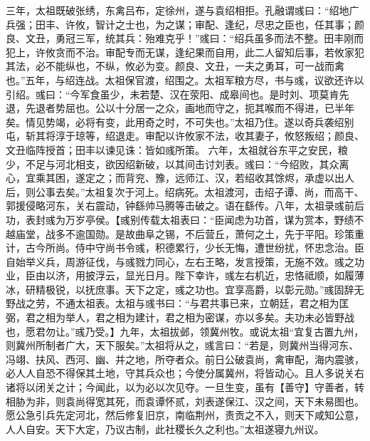 \documentclass[12pt,UTF8]{ctexbook}
\begin{document}
三年，太祖既破张绣，东禽吕布，定徐州，遂与袁绍相拒。孔融谓彧曰：“绍地广兵强；田丰、许攸，智计之士也，为之谋；审配、逢纪，尽忠之臣也，任其事；颜良、文丑，勇冠三军，统其兵：殆难克乎！”彧曰：“绍兵虽多而法不整。田丰刚而犯上，许攸贪而不治。审配专而无谋，逢纪果而自用，此二人留知后事，若攸家犯其法，必不能纵也，不纵，攸必为变。颜良、文丑，一夫之勇耳，可一战而禽也。”五年，与绍连战。太祖保官渡，绍围之。太祖军粮方尽，书与彧，议欲还许以引绍。彧曰：“今军食虽少，未若楚、汉在荥阳、成皋间也。是时刘、项莫肯先退，先退者势屈也。公以十分居一之众，画地而守之，扼其喉而不得进，已半年矣。情见势竭，必将有变，此用奇之时，不可失也。”太祖乃住。遂以奇兵袭绍别屯，斩其将淳于琼等，绍退走。审配以许攸家不法，收其妻子，攸怒叛绍；颜良、文丑临阵授首；田丰以谏见诛：皆如彧所策。
六年，太祖就谷东平之安民，粮少，不足与河北相支，欲因绍新破，以其间击讨刘表。彧曰：“今绍败，其众离心，宜乘其困，遂定之；而背兖、豫，远师江、汉，若绍收其馀烬，承虚以出人后，则公事去矣。”太祖复次于河上。绍病死。太祖渡河，击绍子谭、尚，而高干、郭援侵略河东，关右震动，钟繇帅马腾等击破之。语在繇传。八年，太祖录彧前后功，表封彧为万岁亭侯。【彧别传载太祖表曰：“臣闻虑为功首，谋为赏本，野绩不越庙堂，战多不逾国勋。是故曲阜之锡，不后营丘，萧何之土，先于平阳。珍策重计，古今所尚。侍中守尚书令彧，积德累行，少长无悔，遭世纷扰，怀忠念治。臣自始举义兵，周游征伐，与彧戮力同心，左右王略，发言授策，无施不效。彧之功业，臣由以济，用披浮云，显光日月。陛下幸许，彧左右机近，忠恪祗顺，如履薄冰，研精极锐，以抚庶事。天下之定，彧之功也。宜享高爵，以彰元勋。”彧固辞无野战之劳，不通太祖表。太祖与彧书曰：“与君共事已来，立朝廷，君之相为匡弼，君之相为举人，君之相为建计，君之相为密谋，亦以多矣。夫功未必皆野战也，愿君勿让。”彧乃受。】九年，太祖拔邺，领冀州牧。或说太祖“宜复古置九州，则冀州所制者广大，天下服矣。”太祖将从之，彧言曰：“若是，则冀州当得河东、冯翊、扶风、西河、幽、并之地，所夺者众。前日公破袁尚，禽审配，海内震骇，必人人自恐不得保其土地，守其兵众也；今使分属冀州，将皆动心。且人多说关右诸将以闭关之计；今闻此，以为必以次见夺。一旦生变，虽有【善守】守善者，转相胁为非，则袁尚得宽其死，而袁谭怀贰，刘表遂保江、汉之间，天下未易图也。愿公急引兵先定河北，然后修复旧京，南临荆州，责贡之不入，则天下咸知公意，人人自安。天下大定，乃议古制，此社稷长久之利也。”太祖遂寝九州议。
\end{document}
